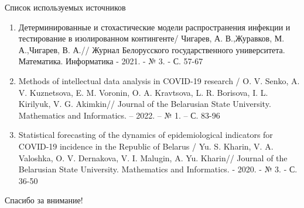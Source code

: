 \documentclass[notheorems]{beamer}
\begin{document}
\begin{frame}
	{Список используемых источников}
	\begin{enumerate}
		\item Детерминированные и стохастические модели распространения инфекции и тестирование в изолированном контингенте/ Чигарев, А. В.,Журавков, М. А.,Чигарев, В. А.// Журнал Белорусского государственного университета. Математика. Информатика - 2021. - № 3. - С. 57-67
		\item Methods of intellectual data analysis in COVID-19 research / O. V. Senko, A. V. Kuznetsova, E. M. Voronin, O. A. Kravtsova, L. R. Borisova, I. L. Kirilyuk, V. G. Akimkin// Journal of the Belarusian State University. Mathematics and Informatics. – 2022. – № 1. – С. 83-96
		\item Statistical forecasting of the dynamics of epidemiological indicators for COVID-19 incidence in the Republic of Belarus / Yu. S. Kharin, V. A. Valoshka, O. V. Dernakova, V. I. Malugin, A. Yu. Kharin// Journal of the Belarusian State University. Mathematics and Informatics. - 2020. - № 3. - С. 36-50
		
		
	\end{enumerate}
\end{frame}


\begin{frame}
	\begin{center}
		\huge{Спасибо за внимание!}
	\end{center}
\end{frame}
\end{document}
